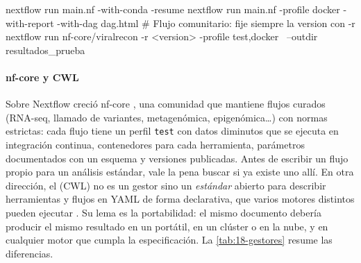 \begin{consola}
nextflow run main.nf -with-conda -resume
nextflow run main.nf -profile docker -with-report -with-dag dag.html
# Flujo comunitario: fije siempre la version con -r
nextflow run nf-core/viralrecon -r <version> -profile test,docker \
    --outdir resultados_prueba
\end{consola}

\paragraph{nf-core y CWL} Sobre Nextflow creció nf-core \parencite{c18-ewels2020}, una comunidad que mantiene flujos curados (RNA-seq, llamado de variantes, metagenómica, epigenómica\ldots) con normas estrictas: cada flujo tiene un perfil \texttt{test} con datos diminutos que se ejecuta en integración continua, contenedores para cada herramienta, parámetros documentados con un esquema y versiones publicadas. Antes de escribir un flujo propio para un análisis estándar, vale la pena buscar si ya existe uno allí. En otra dirección, el  (CWL) no es un gestor sino un \emph{estándar} abierto para describir herramientas y flujos en YAML de forma declarativa, que varios motores distintos pueden ejecutar \parencite{c18-crusoe2022}. Su lema es la portabilidad: el mismo documento debería producir el mismo resultado en un portátil, en un clúster o en la nube, y en cualquier motor que cumpla la especificación. La \cref{tab:18-gestores} resume las diferencias.

